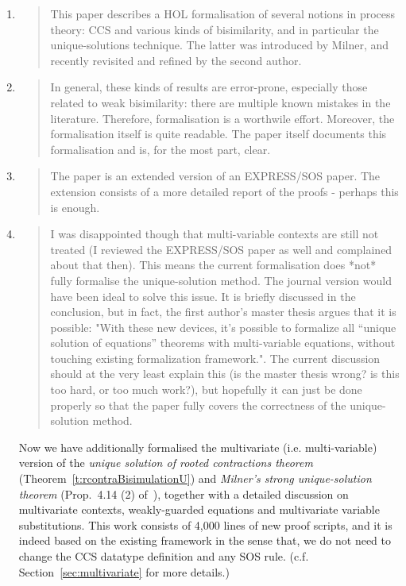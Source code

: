 \begin{enumerate}
\item \begin{quote}
    This paper describes a HOL formalisation of several notions in
    process theory: CCS and various kinds of bisimilarity, and in
    particular the unique-solutions technique. The latter was
    introduced by Milner, and recently revisited and refined by the
    second author.
  \end{quote}
  
\item \begin{quote}
    In general, these kinds of results are error-prone, especially
    those related to weak bisimilarity: there are multiple known
    mistakes in the literature. Therefore, formalisation is a
    worthwile effort. Moreover, the formalisation itself is quite
    readable. The paper itself documents this formalisation and is,
    for the most part, clear.
  \end{quote}

\item \begin{quote}
    The paper is an extended version of an EXPRESS/SOS paper. The
    extension consists of a more detailed report of the proofs -
    perhaps this is enough.
  \end{quote}

\item \begin{quote}
    I was disappointed though that multi-variable contexts are still
    not treated (I reviewed the EXPRESS/SOS paper as well and
    complained about that then). This means the current formalisation
    does *not* fully formalise the unique-solution method. The journal
    version would have been ideal to solve this issue. It is briefly
    discussed in the conclusion, but in fact, the first author's
    master thesis argues that it is possible: "With these new devices,
    it’s possible to formalize all “unique solution of equations”
    theorems with multi-variable equations, without touching existing
    formalization framework.". The current discussion should at the
    very least explain this (is the master thesis wrong? is this too
    hard, or too much work?), but hopefully it can just be done
    properly so that the paper fully covers the correctness of the
    unique-solution method. 
  \end{quote}

  Now we have additionally formalised the multivariate (i.e. multi-variable)
  version of the \emph{unique solution of rooted contractions theorem}
  (Theorem~\ref{t:rcontraBisimulationU}) and \emph{Milner's strong
  unique-solution theorem} (Prop.~4.14 (2)
  of~\citep[p.~103]{Mil89}), together with a detailed discussion on
  multivariate contexts, weakly-guarded equations and multivariate
  variable substitutions. This work consists of 4,000 lines of new
  proof scripts, and it is indeed based on the existing framework in
  the sense that, we do not need to change the CCS datatype definition
  and any SOS rule. (c.f. Section~\ref{sec:multivariate} for more details.)


\end{enumerate}
